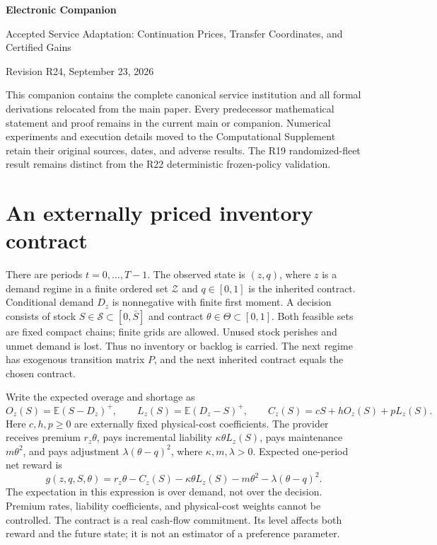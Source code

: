 \documentclass[11pt,letterpaper]{article}
\theoremstyle{definition}
\newcommand{\E}{\mathbb E}
\newcommand{\1}{\mathbf 1}
\newcommand{\pos}[1]{(#1)^+}
\begin{document}
\begin{center}{\Large\bfseries Electronic Companion\par}\medskip
{\large Accepted Service Adaptation: Continuation Prices, Transfer Coordinates, and Certified Gains\par}\medskip
Revision R24, September 23, 2026
\end{center}
This companion contains the complete canonical service institution and all formal derivations relocated from the main paper. Every predecessor mathematical statement and proof remains in the current main or companion. Numerical experiments and execution details moved to the Computational Supplement retain their original sources, dates, and adverse results. The R19 randomized-fleet result remains distinct from the R22 deterministic frozen-policy validation.

\section{An externally priced inventory contract}\label{sec:model}
There are periods $t=0,\ldots,T-1$. The observed state is $(z,q)$, where $z$ is a demand regime in a finite ordered set $\mathcal Z$ and $q\in[0,1]$ is the inherited contract. Conditional demand $D_z$ is nonnegative with finite first moment. A decision consists of stock $S\in\mathcal S\subset[0,\bar S]$ and contract $\theta\in\Theta\subset[0,1]$. Both feasible sets are fixed compact chains; finite grids are allowed. Unused stock perishes and unmet demand is lost. Thus no inventory or backlog is carried. The next regime has exogenous transition matrix $P$, and the next inherited contract equals the chosen contract.

Write the expected overage and shortage as
\begin{equation}\label{eq:cost}
 O_z(S)=\E\pos{S-D_z},\qquad L_z(S)=\E\pos{D_z-S},\qquad
 C_z(S)=cS+hO_z(S)+pL_z(S).
\end{equation}
Here $c,h,p\geq0$ are externally fixed physical-cost coefficients. The provider receives premium $r_z\theta$, pays incremental liability $\kappa\theta L_z(S)$, pays maintenance $m\theta^2$, and pays adjustment $\lambda(\theta-q)^2$, where $\kappa,m,\lambda>0$. Expected one-period net reward is
\begin{equation}\label{eq:reward}
 g(z,q,S,\theta)=r_z\theta-C_z(S)-\kappa\theta L_z(S)
                       -m\theta^2-\lambda(\theta-q)^2.
\end{equation}
The expectation in this expression is over demand, not over the decision. Premium rates, liability coefficients, and physical-cost weights cannot be controlled. The contract is a real cash-flow commitment. Its level affects both reward and the future state; it is not an estimator of a preference parameter.
\end{document}
